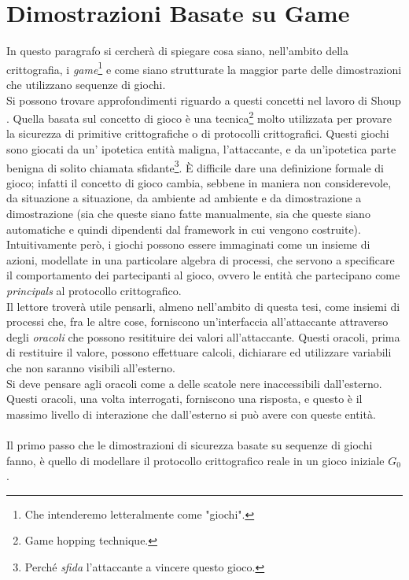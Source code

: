 \documentclass[a4paper,openright,twoside,12pt]{report}
\begin{document}
\section{Dimostrazioni Basate su Game}
In questo paragrafo si cercher\`a di spiegare cosa siano, nell'ambito della crittografia, i \emph{game}\footnote{Che intenderemo letteralmente come "giochi".} e come siano strutturate la
maggior parte delle dimostrazioni che utilizzano sequenze di giochi.\\Si possono trovare approfondimenti riguardo a questi concetti nel lavoro di Shoup \cite{shoup}.
Quella basata sul concetto di gioco \`e una tecnica\footnote{Game hopping technique.} molto utilizzata per provare la sicurezza di primitive crittografiche o di protocolli crittografici.
Questi giochi sono giocati da un' ipotetica entit\`a maligna, l'attaccante, e da un'ipotetica parte benigna di solito chiamata sfidante\footnote{Perch\'e \emph{sfida} l'attaccante a 
vincere questo gioco.}. 
\`E difficile dare una definizione formale di gioco; infatti il concetto di gioco cambia, sebbene in maniera non considerevole, da situazione a situazione, da ambiente ad ambiente e 
da dimostrazione a dimostrazione (sia che queste siano fatte manualmente, sia che queste siano automatiche e quindi dipendenti dal framework in cui vengono costruite).
Intuitivamente per\`o, i giochi possono essere immaginati come un insieme di azioni, modellate in una particolare algebra di processi, 
che servono a specificare il comportamento dei partecipanti al gioco, ovvero le entit\`a che partecipano come \emph{principals} al protocollo crittografico.\\
Il lettore trover\`a utile pensarli, almeno nell'ambito di questa tesi, come insiemi di processi che, fra le altre cose, forniscono un'interfaccia all'attaccante attraverso degli 
\emph{oracoli} che possono resitituire dei valori all'attaccante. Questi oracoli, prima di restituire il valore, possono effettuare calcoli, dichiarare ed utilizzare variabili che non saranno
visibili all'esterno.\\Si deve pensare agli oracoli come a delle scatole nere inaccessibili dall'esterno. Questi oracoli, una volta interrogati, forniscono una risposta,
e questo \`e il massimo livello di interazione che dall'esterno si pu\`o avere con queste entit\`a.\\ \\
Il primo passo che le dimostrazioni di sicurezza basate su sequenze di giochi fanno, \`e quello di modellare il protocollo crittografico reale in un gioco iniziale $G_0$.
\end{document}
